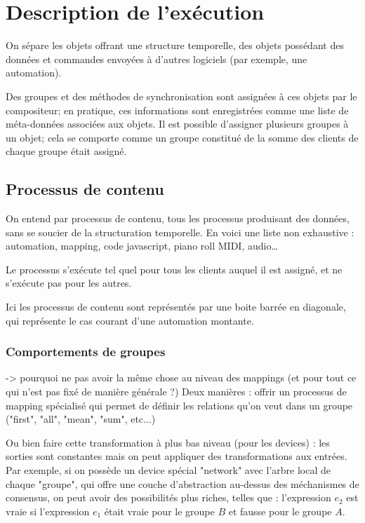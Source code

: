 \documentclass{article}
\begin{document}
\section{Description de l'exécution}\label{sec.description}
On sépare les objets offrant une structure temporelle, des objets possédant des données et commandes envoyées à d'autres logiciels (par exemple, une automation).

Des groupes et des méthodes de synchronisation sont assignées à ces objets par le compositeur; en pratique, ces informations sont enregistrées comme une liste de méta-données associées aux objets.
Il est possible d'assigner plusieurs groupes à un objet; cela se comporte comme un groupe constitué de la somme des clients de chaque groupe était assigné.

\subsection{Processus de contenu}
On entend par processus de contenu, tous les processus produisant des données, sans se soucier de la structuration temporelle. En voici une liste non exhaustive : automation, mapping, code javascript, piano roll MIDI, audio\dots

Le processus s'exécute tel quel pour tous les clients auquel il est assigné, 
et ne s'exécute pas pour les autres.

Ici les processus de contenu sont représentés par une boite barrée en diagonale, qui représente le cas courant d'une automation montante.

\subsubsection{Comportements de groupes}
-> pourquoi ne pas avoir la même chose au niveau des mappings (et pour tout ce qui n'est pas fixé de manière générale ?)
Deux manières : offrir un processus de mapping spécialisé qui permet de définir les relations qu'on veut dans un groupe ("first", "all", "mean", "sum", etc...)

Ou bien faire cette transformation à plus bas niveau (pour les devices) : les sorties sont constantes mais on peut appliquer des transformations aux entrées.
Par exemple, si on possède un device spécial "network" avec l'arbre local de chaque "groupe", qui offre une couche d'abstraction au-dessus des méchanismes de consensus, on peut avoir des possibilités plus riches, telles que : l'expression $e_2$ est vraie si l'expression $e_1$ était vraie pour le groupe $B$ et fausse pour le groupe $A$.
\end{document}
